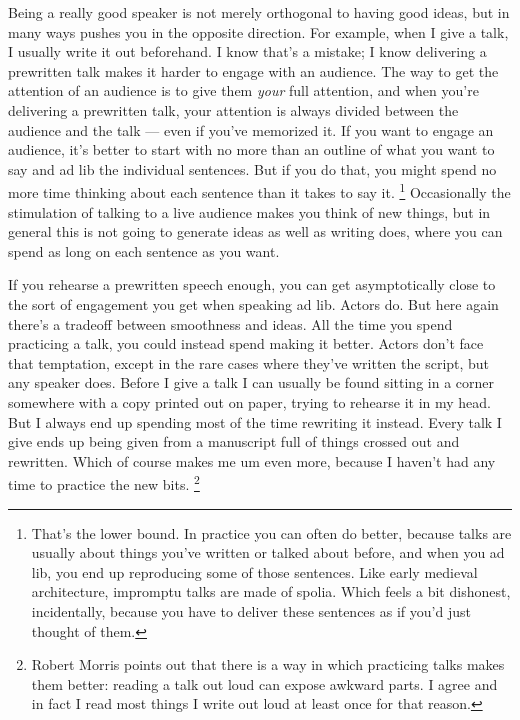 Being a really good speaker is not merely orthogonal to having good
ideas, but in many ways pushes you in the opposite direction. For
example, when I give a talk, I usually write it out beforehand. I know
that's a mistake; I know delivering a prewritten talk makes it harder to
engage with an audience. The way to get the attention of an audience is
to give them \emph{your} full attention, and when you're delivering a
prewritten talk, your attention is always divided between the audience
and the talk --- even if you've memorized it. If you want to engage an
audience, it's better to start with no more than an outline of what you
want to say and ad lib the individual sentences. But if you do that, you
might spend no more time thinking about each sentence than it takes to
say it. \footnote{That's the lower bound. In practice you can often do better,
because talks are usually about things you've written or talked about
before, and when you ad lib, you end up reproducing some of those
sentences. Like early medieval architecture, impromptu talks are made of
spolia. Which feels a bit dishonest, incidentally, because you have to
deliver these sentences as if you'd just thought of them.} Occasionally the stimulation of talking
to a live audience makes you think of new things, but in general this is
not going to generate ideas as well as writing does, where you can spend
as long on each sentence as you want.

If you rehearse a prewritten speech enough, you can get asymptotically
close to the sort of engagement you get when speaking ad lib. Actors do.
But here again there's a tradeoff between smoothness and ideas. All the
time you spend practicing a talk, you could instead spend making it
better. Actors don't face that temptation, except in the rare cases
where they've written the script, but any speaker does. Before I give a
talk I can usually be found sitting in a corner somewhere with a copy
printed out on paper, trying to rehearse it in my head. But I always end
up spending most of the time rewriting it instead. Every talk I give
ends up being given from a manuscript full of things crossed out and
rewritten. Which of course makes me um even more, because I haven't had
any time to practice the new bits. \footnote{Robert Morris points out that there is a way in which practicing
talks makes them better: reading a talk out loud can expose awkward
parts. I agree and in fact I read most things I write out loud at least
once for that reason.}

